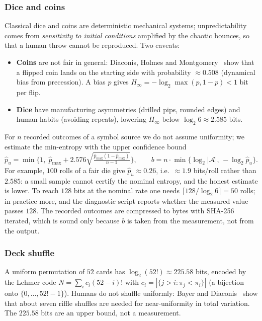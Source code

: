 \documentclass[11pt,a4paper]{article}
\theoremstyle{plain}
\theoremstyle{definition}
\newcommand{\Hmin}{H_\infty}
\begin{document}
\subsubsection{Dice and coins}

Classical dice and coins are deterministic mechanical systems; unpredictability
comes from \emph{sensitivity to initial conditions} amplified by the chaotic
bounces, so that a human throw cannot be reproduced. Two caveats:
\begin{itemize}[leftmargin=1.4em]
    \item \textbf{Coins} are not fair in general: Diaconis, Holmes and
    Montgomery~\cite{dhm07} show that a flipped coin lands on the starting side
    with probability $\approx0.508$ (dynamical bias from precession). A bias
    $p$ gives $\Hmin=-\log_2\max(p,1-p)<1$ bit per flip.
    \item \textbf{Dice} have manufacturing asymmetries (drilled pips, rounded
    edges) and human habits (avoiding repeats), lowering $\Hmin$ below
    $\log_2 6\approx2.585$ bits.
\end{itemize}
For $n$ recorded outcomes of a symbol source we do not assume uniformity; we
estimate the min-entropy with the upper confidence bound
\begin{equation}
    \hat p_u=\min\!\Big\{1,\;\hat p_{\max}+2.576\sqrt{\tfrac{\hat p_{\max}(1-\hat p_{\max})}{n-1}}\Big\},
    \qquad b=n\cdot\min\{\log_2 |\mathcal A|,\,-\log_2\hat p_u\}.
    \label{eq:manual_bits}
\end{equation}
For example, $100$ rolls of a fair die give $\hat p_u\approx0.26$, i.e.\
$\approx1.9$ bits/roll rather than $2.585$: a small sample cannot certify the
nominal entropy, and the honest estimate is lower. To reach $128$ bits at the
nominal rate one needs $\lceil128/\log_2 6\rceil=50$ rolls; in practice more,
and the diagnostic script reports whether the measured value passes $128$.
The recorded outcomes are compressed to bytes with SHA-256 iterated, which is
sound only because $b$ is taken from the measurement, not from the output.

\subsubsection{Deck shuffle}

A uniform permutation of $52$ cards has $\log_2(52!)\approx225.58$ bits, encoded
by the Lehmer code $N=\sum_i c_i(52-i)!$ with $c_i=|\{j>i:\pi_j<\pi_i\}|$
(a bijection onto $\{0,\dots,52!-1\}$). Humans do not shuffle uniformly:
Bayer and Diaconis~\cite{bd92} show that about seven riffle shuffles are needed
for near-uniformity in total variation. The $225.58$ bits are an upper bound,
not a measurement.
\end{document}
